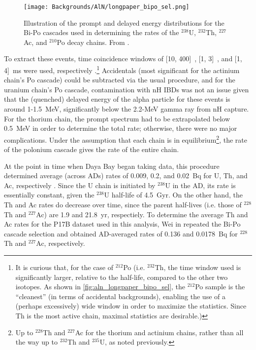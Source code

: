 \documentclass[../thesis.tex]{subfiles}
\begin{document}
\begin{figure}[ht]
  \texttt{[image: Backgrounds/AlN/longpaper\_bipo\_sel.png]}
  \caption{Illustration of the prompt and delayed energy distributions for the Bi-Po cascades used in determining the rates of the $^{238}$U, $^{232}$Th, $^{227}$Ac, and $^{210}$Po decay chains. From \cite{An_2017}.}
  \label{fig:aln_longpaper_bipo_sel}
\end{figure}

To extract these events, time coincidence windows of [10, 400]~\us, [1, 3]~\us, and [1, 4]~ms were used, respectively \cite{An_2017}.\footnote{It is curious that, for the case of $^{212}$Po (i.e. $^{232}$Th, the time window used is significantly larger, relative to the half-life, compared to the other two isotopes. As shown in \autoref{fig:aln_longpaper_bipo_sel}, the $^{212}$Po sample is the ``cleanest'' (in terms of accidental backgrounds), enabling the use of a (perhaps excessively) wide window in order to maximize the statistics. Since Th is the most active chain, maximal statistics are desirable.)} Accidentals (most significant for the actinium chain's Po cascade) could be subtracted via the usual procedure,
and for the uranium chain's Po cascade, contamination with nH IBDs was not an issue given that the (quenched) delayed energy of the alpha particle for these events is around 1-1.5~MeV, significantly below the 2.2-MeV gamma ray from nH capture. For the thorium chain, the prompt spectrum had to be extrapolated below 0.5~MeV in order to determine the total rate; otherwise, there were no major complications. Under the assumption that each chain is in equilibrium\footnote{Up to $^{228}$Th and $^{227}$Ac for the thorium and actinium chains, rather than all the way up to $^{232}$Th and $^{235}$U, as noted previously.}, the rate of the polonium cascade gives the rate of the entire chain.

At the point in time when Daya Bay began taking data, this procedure determined average (across ADs) rates of 0.009, 0.2, and 0.02~Bq for U, Th, and Ac, respectively \cite{lianghongBkg}. Since the U chain is initiated by $^{238}$U in the AD, its rate is essentially constant, given the $^{238}$U half-life of 4.5~Gyr. On the other hand, the Th and Ac rates do decrease over time, since the parent half-lives (i.e. those of $^{228}$Th and $^{227}$Ac) are 1.9 and 21.8~yr, respectiely. To determine the average Th and Ac rates for the P17B dataset used in this analysis, Wei in \cite{lianghongBkg} repeated the Bi-Po cascade selection and obtained AD-averaged rates of 0.136 and 0.0178~Bq for $^{228}$Th and $^{227}$Ac, respectively.
\end{document}
